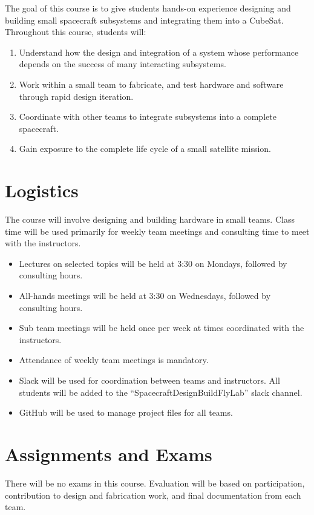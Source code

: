 \documentclass[11pt,letterpaper]{article}
\begin{document}
The goal of this course is to give students hands-on experience designing and building small spacecraft subsystems and integrating them into a CubeSat. Throughout this course, students will:
\begin{enumerate}
	\item Understand how the design and integration of a system whose performance depends on the success of many interacting subsystems.
	\item Work within a small team to fabricate, and test hardware and software through rapid design iteration.
	\item Coordinate with other teams to integrate subsystems into a complete spacecraft.
	\item Gain exposure to the complete life cycle of a small satellite mission.
\end{enumerate}


\section*{Logistics}

The course will involve designing and building hardware in small teams. Class time will be used primarily for weekly team meetings and consulting time to meet with the instructors.

\begin{itemize}
	\item Lectures on selected topics will be held at 3:30 on Mondays, followed by consulting hours.
	\item All-hands meetings will be held at 3:30 on Wednesdays, followed by consulting hours.
	\item Sub team meetings will be held once per week at times coordinated with the instructors.
	\item Attendance of weekly team meetings is mandatory.
	\item Slack will be used for coordination between teams and instructors. All students will be added to the ``SpacecraftDesignBuildFlyLab'' slack channel.
	\item GitHub will be used to manage project files for all teams.
\end{itemize}

\section*{Assignments and Exams}

There will be no exams in this course. Evaluation will be based on participation, contribution to design and fabrication work, and final documentation from each team.
\end{document}
